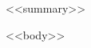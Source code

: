 \documentclass[11pt, a4paper]{cvClass}
\begin{document}
\makecvheader

\vspace{2mm}
{\fontsize{9.5pt}{12.5pt}\bodyfontlight\color{text}<<summary>>\par}

<<body>>
\end{document}
